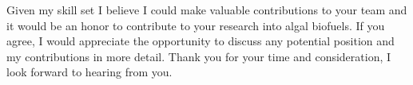 \documentclass[11pt,a4paper,sans]{moderncv}
\begin{document}
\begin{spacing}{1.15}
Given my skill set I believe I could make valuable contributions to your team and it would be an honor to contribute to your research into algal biofuels. 
If you agree, I would appreciate the opportunity to discuss any potential position and my contributions in more detail. 
Thank you for your time and consideration, I look forward to hearing from you.


 

\end{spacing}
\makeletterclosing
\end{document}
